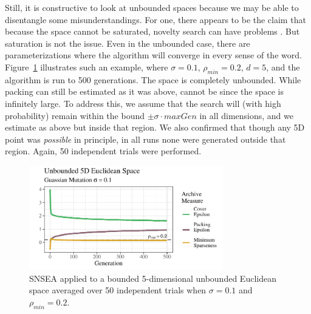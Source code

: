 \documentclass[twoside]{article}
\begin{document}
Still, it is constructive to look at unbounded spaces because we may be able to disentangle some misunderstandings.  For one, there appears to be the claim that because the space cannot be saturated, novelty search can have problems \citep{LehmanStanley2008ssls,Doncieux2019gecco}.  But saturation is not the issue.  Even in the unbounded case, there are parameterizations where the algorithm will converge in every sense of the word.  Figure~\ref{fig:unbounded:nopop:0102} illustrates such an example, where $\sigma=0.1$, $\rho_{min}= 0.2$, $d=5$, and the algorithm is run to 500 generations.  The space is completely unbounded.  While packing can still be estimated as it was above,  cannot be since the space is infinitely large.  To address this, we assume that the search will (with high probability) remain within the bound $\pm\sigma\cdot maxGen$ in all dimensions, and we estimate  as above but inside that region.  We also confirmed that though any 5D point was \emph{possible} in principle, in all runs none were generated outside that region.  Again, 50 independent trials were performed.
%
\begin{figure}[h]
  \center\includegraphics[width=0.75\textwidth]{Figures/unbounded-s01-r02-NOPOP.pdf}
  \caption{\label{fig:unbounded:nopop:0102} SNSEA applied to a bounded 5-dimensional unbounded Euclidean space averaged over 50 independent trials when $\sigma=0.1$ and $\rho_{min}=0.2$.}
\end{figure}
\end{document}
